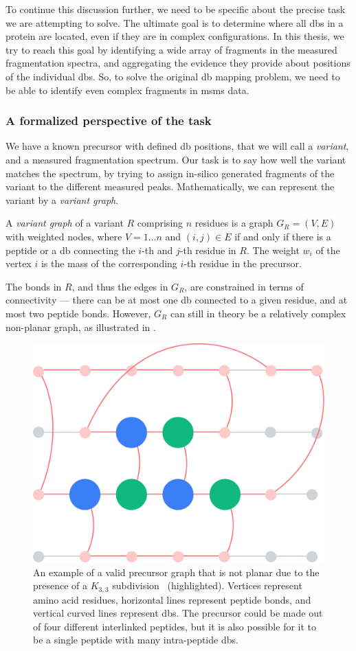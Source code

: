 To continue this discussion further, we need to be specific about the precise task we are attempting to solve. The ultimate goal is to determine where all \glspl*{db} in a protein are located, even if they are in complex configurations. In this thesis, we try to reach this goal by identifying a wide array of fragments in the measured fragmentation spectra, and aggregating the evidence they provide about positions of the individual \glspl*{db}. So, to solve the original \gls*{db} mapping problem, we need to be able to identify even complex fragments in \gls*{msms} data.

\subsubsection{A formalized perspective of the task}

We have a known precursor with defined \gls*{db} positions, that we will call a \emph{variant}, and a measured fragmentation spectrum. Our task is to say how well the variant matches the spectrum, by trying to assign in-silico generated fragments of the variant to the different measured peaks. Mathematically, we can represent the variant by a \emph{variant graph}.

\begin{defn}
  A \emph{variant graph} of a variant \(R\) comprising \(n\) residues is a graph \(G_R = (V, E)\) with weighted nodes, where \(V  = 1\ldots n\) and \((i, j) \in E\) if and only if there is a peptide or a \gls*{db} connecting  the \(i\)-th and \(j\)-th residue in \(R\). The weight \(w_i\) of the vertex \(i\) is the mass of the corresponding \(i\)-th residue in the precursor.
\end{defn}

The bonds in \(R\), and thus the edges in \(G_R\), are constrained in terms of connectivity --- there can be at most one \gls*{db} connected to a given residue, and at most two peptide bonds. However, \(G_R\) can still in theory be a relatively complex non-planar graph, as illustrated in .

\begin{figure}
  \centering
  \includegraphics[width=0.5\linewidth]{img/nonplanar.pdf}
  \caption{An example of a valid precursor graph that is not planar due to the presence of a \(K_{3, 3}\) subdivision~\cite{kuratowski1930probleme} (highlighted). Vertices represent amino acid residues, horizontal lines represent peptide bonds, and vertical curved lines represent \glspl*{db}. The precursor could be made out of four different interlinked peptides, but it is also possible for it to be a single peptide with many intra-peptide \glspl*{db}.}\label{fig:nonplanar}
\end{figure}


